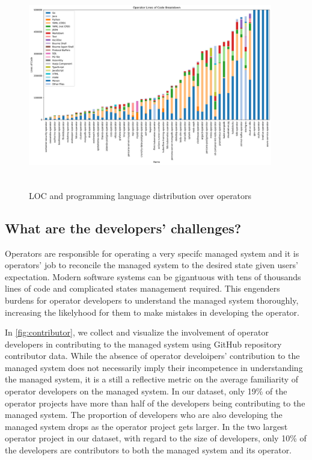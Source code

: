 \begin{figure}
    \centering
    \includegraphics[width=0.95\textwidth,height=9cm]{figures/operator-loc-bar.png}
    \caption{LOC and programming language distribution over operators}
    \label{fig:loc}
\end{figure}


\subsection{What are the developers' challenges?}
Operators are responsible for operating a very specifc managed system and it is
operators' job to reconcile the managed system to the desired state given
users' expectation. Modern software systems can be gigantuous with tens of
thousands lines of code and complicated states management required. This
engenders burdens for operator developers to understand the managed system
thoroughly, increasing the likelyhood for them to make mistakes in developing
the operator.

In \figurename{ \ref{fig:contributor}}, we collect and visualize the
involvement of operator developers in contributing to the managed system using
GitHub repository contributor data. While the absence of operator develoipers'
contribution to the managed system does not necessarily imply their
incompetence in understanding the managed system, it is a still a reflective
metric on the average familiarity of operator developers on the managed system.
In our dataset, only 19\% of the operator projects have more than half of the
developers being contributing to the managed system. The proportion of
developers who are also developing the managed system drops as the operator
project gets larger. In the two largest operator project in our dataset, with
regard to the size of developers, only 10\% of the developers are contributors
to both the managed system and its operator.

